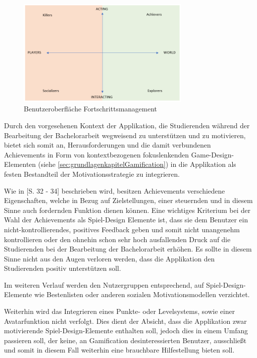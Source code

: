 \documentclass[bibliography=totoc,listof=totoc,BCOR=5mm,DIV=12,oneside]{scrbook}
\begin{document}
\begin{figure}[H]
	\centering
	\includegraphics[width=0.75\textwidth, keepaspectratio]{Bilder/Diagramme/InterestGraphBartleAchieversExplorers.png}
	\caption{Benutzeroberfläche Fortschrittsmanagement}
	\label{img:interestGraphBartleAchiversExplorers}
\end{figure}

\par Durch den vorgesehenen Kontext der Applikation, die Studierenden während der Bearbeitung der Bachelorarbeit wegweisend zu unterstützen und zu motivieren, bietet sich somit an, Herausforderungen und die damit verbundenen Achievements in Form von kontextbezogenen fokuslenkenden Game-Design-Elementen (siehe \ref{sec:grundlagenkapitelGamification}) in die Applikation als festen Bestandteil der Motivationsstrategie zu integrieren.

\par\medskip Wie in \citep{Sailer2016}[S. 32 - 34] beschrieben wird, besitzen Achievements verschiedene Eigenschaften, welche in Bezug auf Zielstellungen, einer steuernden und in diesem Sinne auch fordernden Funktion dienen können. Eine wichtiges Kriterium bei der Wahl der Achievements als Spiel-Design Elemente ist, dass sie dem Benutzer ein nicht-kontrollierendes, positives Feedback geben und somit nicht unangenehm kontrollieren oder den ohnehin schon sehr hoch ausfallenden Druck auf die Studierenden bei der Bearbeitung der Bachelorarbeit erhöhen. Es sollte in diesem Sinne nicht aus den Augen verloren werden, dass die Applikation den Studierenden positiv unterstützen soll.

\par\medskip Im weiteren Verlauf werden den Nutzergruppen entsprechend, auf Spiel-Design-Elemente wie Bestenlisten oder anderen sozialen Motivationsmodellen verzichtet.

\par Weiterhin wird das Integrieren eines Punkte- oder Levelsystems, sowie einer Avatarfunktion nicht verfolgt. Dies dient der Absicht, dass die Applikation zwar motivierende Spiel-Design-Elemente enthalten soll, jedoch dies in einem Umfang passieren soll, der keine, an Gamification desinteressierten Benutzer, ausschließt und somit in diesem Fall weiterhin eine brauchbare Hilfestellung bieten soll.
\end{document}
